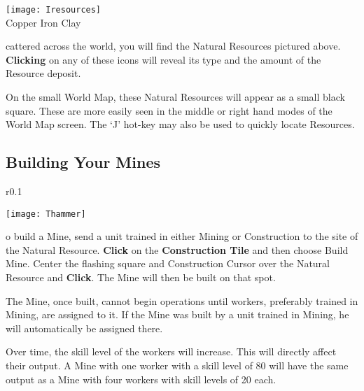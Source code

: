 

\begin{center}
\texttt{[image: Iresources]} %
\\ Copper Iron Clay
\end{center}

cattered across the world, you will find the Natural Resources pictured above. \textbf{Clicking} on any of these icons will reveal its type and the amount of the Resource deposit.


On the small World Map, these Natural Resources will appear as a small black square. These are more easily seen in the middle or right hand modes of the World Map screen. The ‘J’ hot-key may also be used to quickly locate Resources.

\subsection{Building Your Mines}


\begin{wrapfigure}{r}{0.1\textwidth}
	\vspace{-20pt}
	\begin{center}
		\texttt{[image: Thammer]}
	\end{center}
	\vspace{-20pt}
\end{wrapfigure}


o build a Mine, send a unit trained in either Mining or Construction to the site of the Natural Resource. \textbf{Click} on the \textbf{Construction Tile} and then choose Build Mine. Center the flashing square and Construction Cursor over the Natural Resource and \textbf{Click}. The Mine will then be built on that spot.

The Mine, once built, cannot begin operations until workers, preferably trained in Mining, are assigned to it. If the Mine was built by a unit trained in Mining, he will automatically be assigned there.

Over time, the skill level of the workers will increase. This will directly affect their output. A Mine with one worker with a skill level of 80 will have the same output as a Mine with four workers with skill levels of 20 each.

